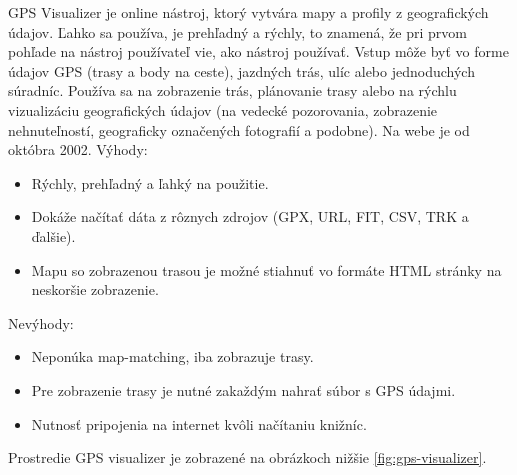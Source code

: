 \indent \indent GPS Visualizer je online nástroj, ktorý vytvára mapy a profily z geografických údajov. Ľahko sa používa, je prehľadný a rýchly, to znamená, že pri prvom pohľade na nástroj používateľ vie, ako nástroj používať. Vstup môže byť vo forme údajov GPS (trasy a body na ceste), jazdných trás, ulíc alebo jednoduchých súradníc. Používa sa na zobrazenie trás, plánovanie trasy alebo na rýchlu vizualizáciu geografických údajov (na vedecké pozorovania, zobrazenie nehnuteľností, geograficky označených fotografií a podobne). Na webe je od októbra 2002\cite{gps_visualizer}. Výhody:
\begin{itemize}
  \item Rýchly, prehľadný a ľahký na použitie.
  \item Dokáže načítať dáta z rôznych zdrojov (GPX, URL, FIT, CSV, TRK a ďalšie).
  \item Mapu so zobrazenou trasou je možné stiahnuť vo formáte HTML stránky na neskoršie zobrazenie.
\end{itemize}
Nevýhody:
\begin{itemize}
  \item Neponúka map-matching, iba zobrazuje trasy.
  \item Pre zobrazenie trasy je nutné zakaždým nahrať súbor s GPS údajmi.
  \item Nutnosť pripojenia na internet kvôli načítaniu knižníc.
\end{itemize}
Prostredie GPS visualizer je zobrazené na obrázkoch nižšie \ref{fig:gps-visualizer}.
